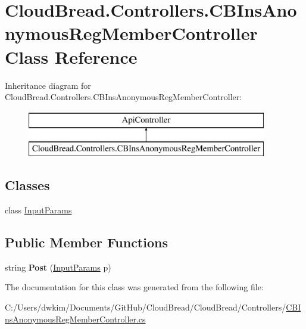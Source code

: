 \hypertarget{class_cloud_bread_1_1_controllers_1_1_c_b_ins_anonymous_reg_member_controller}{}\section{Cloud\+Bread.\+Controllers.\+C\+B\+Ins\+Anonymous\+Reg\+Member\+Controller Class Reference}
\label{class_cloud_bread_1_1_controllers_1_1_c_b_ins_anonymous_reg_member_controller}
Inheritance diagram for Cloud\+Bread.\+Controllers.\+C\+B\+Ins\+Anonymous\+Reg\+Member\+Controller\+:\begin{figure}[H]
\begin{center}
\leavevmode
\includegraphics[height=2.000000cm]{class_cloud_bread_1_1_controllers_1_1_c_b_ins_anonymous_reg_member_controller}
\end{center}
\end{figure}
\subsection*{Classes}
\begin{DoxyCompactItemize}
\item 
class \hyperlink{class_cloud_bread_1_1_controllers_1_1_c_b_ins_anonymous_reg_member_controller_1_1_input_params}{Input\+Params}
\end{DoxyCompactItemize}
\subsection*{Public Member Functions}
\begin{DoxyCompactItemize}
\item 
string {\bfseries Post} (\hyperlink{class_cloud_bread_1_1_controllers_1_1_c_b_ins_anonymous_reg_member_controller_1_1_input_params}{Input\+Params} p)\hypertarget{class_cloud_bread_1_1_controllers_1_1_c_b_ins_anonymous_reg_member_controller_aa0a9dad7adb9084a06daf2dd3dd829b4}{}\label{class_cloud_bread_1_1_controllers_1_1_c_b_ins_anonymous_reg_member_controller_aa0a9dad7adb9084a06daf2dd3dd829b4}

\end{DoxyCompactItemize}


The documentation for this class was generated from the following file\+:\begin{DoxyCompactItemize}
\item 
C\+:/\+Users/dwkim/\+Documents/\+Git\+Hub/\+Cloud\+Bread/\+Cloud\+Bread/\+Controllers/\hyperlink{_c_b_ins_anonymous_reg_member_controller_8cs}{C\+B\+Ins\+Anonymous\+Reg\+Member\+Controller.\+cs}\end{DoxyCompactItemize}
